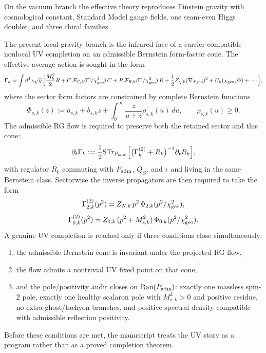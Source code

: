 \begin{corollary}
On the vacuum branch the effective theory reproduces Einstein gravity with cosmological constant, Standard Model gauge fields, one seam-even Higgs doublet, and three chiral families.
\end{corollary}

\begin{conjecture}
The present local gravity branch is the infrared face of a carrier-compatible
nonlocal UV completion on an admissible Bernstein form-factor cone. The effective
average action is sought in the form
\[
\Gamma_k
=
\int d^4x\sqrt g\,
\Bigl[
\frac{M_k^2}{2}R
+C\,\mathcal F_{C,k}(\Box/\chi_{\mathrm{geo}}^2)\,C
+R\,\mathcal F_{R,k}(\Box/\chi_{\mathrm{geo}}^2)\,R
+\frac12 Z_{\chi,k}(\nabla\chi_{\mathrm{geo}})^2
+U_k(\chi_{\mathrm{geo}},\Phi)
+\cdots
\Bigr],
\]
where the sector form factors are constrained by complete Bernstein functions
\[
\Phi_{s,k}(z)
:=
a_{s,k}+b_{s,k}z+\int_0^\infty \frac{z}{u+z}\rho_{s,k}(u)\,du,
\qquad
\rho_{s,k}(u)\ge 0.
\]
The admissible RG flow is required to preserve both the retained sector and this
cone:
\[
\partial_t\Gamma_k
:=
\frac12\mathrm{STr}_{P_{\mathrm{adm}}}
\Bigl[
\bigl(\Gamma_k^{(2)}+R_k\bigr)^{-1}\partial_t R_k
\Bigr],
\]
with regulator $R_k$ commuting with $P_{\mathrm{adm}}$, $Q_\Theta$, and $\iota$ and living in
the same Bernstein class. Sectorwise the inverse propagators are then required to
take the form
\[
\Gamma^{(2)}_{2,k}(p^2)
=
Z_{N,k}\,p^2\,\Phi_{2,k}(p^2/\chi_{\mathrm{geo}}^2),
\]
\[
\Gamma^{(2)}_{0,k}(p^2)
=
Z_{0,k}\,(p^2+M_{s,k}^2)\,\Phi_{0,k}(p^2/\chi_{\mathrm{geo}}^2).
\]
A genuine UV completion is reached only if three conditions close
simultaneously:
\begin{enumerate}[label=(\roman*), leftmargin=1.5em, topsep=3pt, itemsep=2pt]
    \item the admissible Bernstein cone is invariant under the projected RG flow,
    \item the flow admits a nontrivial UV fixed point on that cone,
    \item and the pole/positivity audit closes on $\operatorname{Ran}(P_{\mathrm{adm}})$:
    exactly one massless spin-$2$ pole, exactly one healthy scalaron pole with
    $M_{s,k}^2>0$ and positive residue, no extra ghost/tachyon branches, and
    positive spectral density compatible with admissible reflection positivity.
\end{enumerate}
Before these conditions are met, the manuscript treats the UV story as a
program rather than as a proved completion theorem.
\end{conjecture}

